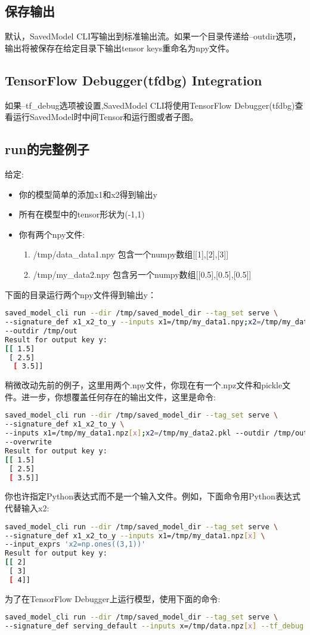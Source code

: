 \subsection{保存输出}
默认，SavedModel CLI写输出到标准输出流。如果一个目录传递给--outdir选项，输出将被保存在给定目录下输出tensor keys重命名为npy文件。
\subsection{TensorFlow Debugger(tfdbg) Integration}
如果--tf\_debug选项被设置,SavedModel CLI将使用TensorFlow Debugger(tfdbg)查看运行SavedModel时中间Tensor和运行图或者子图。
\subsection{run的完整例子}
给定:
\begin{itemize}
\item 你的模型简单的添加x1和x2得到输出y
\item 所有在模型中的tensor形状为(-1,1)
\item 你有两个npy文件:
\begin{enumerate}
	\item /tmp/data\_data1.npy 包含一个numpy数组[[1],[2],[3]]
	\item /tmp/my\_data2.npy 包含另一个numpy数组[[0.5],[0.5],[0.5]]
\end{enumerate}
\end{itemize}
下面的目录运行两个npy文件得到输出y：
\begin{lstlisting}[language=Bash]
saved_model_cli run --dir /tmp/saved_model_dir --tag_set serve \
--signature_def x1_x2_to_y --inputs x1=/tmp/my_data1.npy;x2=/tmp/my_data2.npy \
--outdir /tmp/out
Result for output key y:
[[ 1.5]
 [ 2.5]
  [ 3.5]]
\end{lstlisting}
稍微改动先前的例子，这里用两个.npy文件，你现在有一个.npz文件和pickle文件。进一步，你想覆盖任何存在的输出文件，这里是命令:
\begin{lstlisting}[language=Bash]
saved_model_cli run --dir /tmp/saved_model_dir --tag_set serve \
--signature_def x1_x2_to_y \
--inputs x1=/tmp/my_data1.npz[x];x2=/tmp/my_data2.pkl --outdir /tmp/out \
--overwrite
Result for output key y:
[[ 1.5]
 [ 2.5]
 [ 3.5]]
\end{lstlisting}
你也许指定Python表达式而不是一个输入文件。例如，下面命令用Python表达式代替输入x2:
\begin{lstlisting}[language=Bash]
saved_model_cli run --dir /tmp/saved_model_dir --tag_set serve \
--signature_def x1_x2_to_y --inputs x1=/tmp/my_data1.npz[x] \
--input_exprs 'x2=np.ones((3,1))'
Result for output key y:
[[ 2]
 [ 3]
 [ 4]]
\end{lstlisting}
为了在TensorFlow Debugger上运行模型，使用下面的命令:
\begin{lstlisting}[language=Bash]
saved_model_cli run --dir /tmp/saved_model_dir --tag_set serve \
--signature_def serving_default --inputs x=/tmp/data.npz[x] --tf_debug 
\end{lstlisting}
